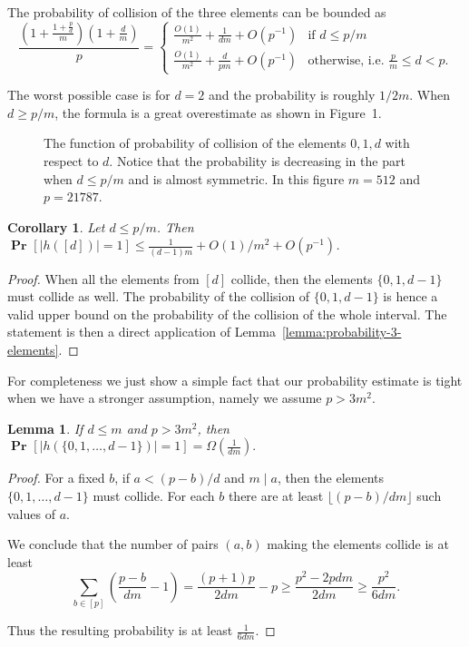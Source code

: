 \documentclass{article}
\newcommand{\probs}[2]{\operatorname{\mathbf{Pr}}_{{#1}}\left[{#2}\right]}
\newcommand{\prob}[1]{\probs{}{#1}}
\newtheorem{lemma}{Lemma}
\newtheorem{corollary}{Corollary}
\begin{document}
The probability of collision of the three elements can be bounded as
\[
\frac{\left(1 + \frac{1 + \frac{p}{d}}{m}\right)\left(1 + \frac{d}{m}\right)}{p} =
\begin{cases}
	\frac{O(1)}{m^2} + \frac{1}{dm} + O\left(p^{-1}\right) & \mbox{if } d \leq p/m \\
	\frac{O(1)}{m^2} + \frac{d}{pm} + O\left(p^{-1}\right) & \mbox{otherwise, i.e. } \frac{p}{m} \leq d < p.
\end{cases}
\]

The worst possible case is for $d = 2$ and the probability is roughly $1/2m$. 
When $d \geq p/m$, the formula is a great overestimate as shown in Figure~1.

\begin{figure}[ht]
	\label{fig:probability-3}
	\centering
	\caption{The function of probability of collision of the elements $0, 1, d$ with respect to $d$. Notice that the probability is decreasing in the part when $d \leq p / m$ and is almost symmetric. In this figure $m = 512$ and $p = 21787$.}
\end{figure}

\begin{corollary}
\label{co:d-elements}
Let $d \leq p / m$. Then $\prob{|h([d])| = 1} \leq \frac{1}{(d - 1) m} + O(1)/m^2 + O(p^{-1})$.
\end{corollary}
\begin{proof}
When all the elements from $[d]$ collide, then the elements $\{0, 1, d - 1\}$ must collide as well. The probability of the collision of $\{0, 1, d - 1\}$ is hence a valid upper bound on the probability of the collision of the whole interval. The statement is then a direct application of Lemma~\ref{lemma:probability-3-elements}.
\end{proof}

For completeness we just show a simple fact that our probability estimate is tight when we have a stronger assumption, namely we assume $p > 3m^2$.

\begin{lemma}
\label{lm:0-d-prob-lower-bound}
If $d \leq m$ and $p > 3m^2$, then $\prob{|h(\{0, 1, \ldots, d - 1\})| = 1} = \Omega\left(\frac{1}{dm}\right).$
\end{lemma}
\begin{proof}
For a fixed $b$, if $a < (p - b)/d$ and $m \mid a$, then the elements $\{0, 1, \ldots, d - 1\}$ must collide.
For each $b$ there are at least $\lfloor (p - b)/dm \rfloor$ such values of $a$.

We conclude that the number of pairs $(a, b)$ making the elements collide is at least
\[
\sum_{b \in [p]} \left(\frac{p - b}{dm} - 1\right) = \frac{(p + 1)p}{2dm} - p \geq \frac{p ^ 2 - 2pdm}{2dm} \geq \frac{p^2}{6dm}.
\]

Thus the resulting probability is at least $\frac{1}{6dm}$.
\end{proof}
\end{document}
